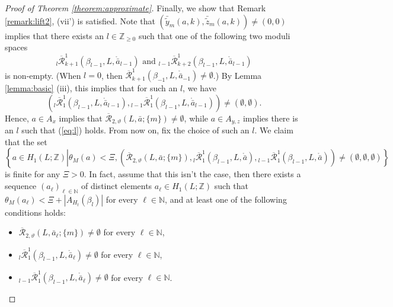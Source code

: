\documentclass[a4paper]{article}
\numberwithin{equation}{section}
\begin{document}
\begin{proof}[Proof of Theorem \ref{theorem:approximate}]
Finally, we show that Remark \ref{remark:lift2}, (vii') is satisfied. Note that $\left(\bar{\tilde{y}}_m(a,k),\bar{\tilde{z}}_m(a,k)\right)\neq(0,0)$ implies that there exists an $l\in\mathbb{Z}_{\geq0}$ such that one of the following two moduli spaces
\begin{equation}
{}_l\overline{\mathcal{R}}_{k+1}^1(\beta_{l-1},L,\ring{\bar{a}}_{l-1})\textrm{ and }{}_{l-1}\overline{\mathcal{R}}_{k+2}^1(\beta_{l-1},L,\ring{\bar{a}}_{l-1})
\end{equation}
is non-empty. (When $l=0$, then $\overline{\mathcal{R}}_{k+1}^1(\beta_{-1},L,\ring{\bar{a}}_{-1})\neq\emptyset$.) By Lemma \ref{lemma:basic} (iii), this implies that for such an $l$, we have
\begin{equation}\label{eq:l}
\left({}_{l}\overline{\mathcal{R}}_1^1(\beta_{l-1},L,\ring{\bar{a}}_{l-1}),{}_{l-1}\overline{\mathcal{R}}_1^1(\beta_{l-1},L,\ring{\bar{a}}_{l-1})\right)\neq(\emptyset,\emptyset).
\end{equation}
Hence, $a\in A_x$ implies that $\overline{\mathcal{R}}_{2,\vartheta}(L,\bar{a};\{m\})\neq\emptyset$, while $a\in A_{y,z}$ implies there is an $l$ such that (\ref{eq:l}) holds. From now on, fix the choice of such an $l$. We claim that the set
\begin{equation}\label{eq:s}
\left\{a\in H_1(L;\mathbb{Z})\left\vert\theta_M(a)<\Xi,\left(\overline{\mathcal{R}}_{2,\vartheta}(L,\bar{a};\{m\}),{}_{l}\overline{\mathcal{R}}_1^1(\beta_{l-1},L,\ring{\bar{a}}),{}_{l-1}\overline{\mathcal{R}}_1^1(\beta_{l-1},L,\ring{\bar{a}})\right)
\neq(\emptyset,\emptyset,\emptyset)\right.\right\}
\end{equation}
is finite for any $\Xi>0$. In fact, assume that this isn't the case, then there exists a sequence $(a_\ell)_{\ell\in\mathbb{N}}$ of distinct elements $a_\ell\in H_1(L;\mathbb{Z})$ such that $\theta_M(a_\ell)<\Xi+|A_{H_t}(\beta_l)|$ for every $\ell\in\mathbb{N}$, and at least one of the following conditions holds:
\begin{itemize}
	\item $\overline{\mathcal{R}}_{2,\vartheta}(L,\bar{a}_\ell;\{m\})\neq\emptyset$ for every $\ell\in\mathbb{N}$,
	\item ${}_{l}\overline{\mathcal{R}}_1^1(\beta_{l-1},L,\ring{\bar{a}}_\ell)\neq\emptyset$ for every $\ell\in\mathbb{N}$,
	\item ${}_{l-1}\overline{\mathcal{R}}_1^1(\beta_{l-1},L,\ring{\bar{a}}_\ell)\neq\emptyset$ for every $\ell\in\mathbb{N}$.
\end{itemize}

\end{proof}
\end{document}
